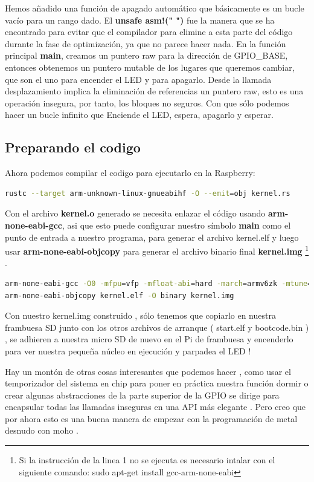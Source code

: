 \documentclass[12pt, twoside]{report}
\begin{document}
Hemos añadido una función de apagado automático que básicamente es un bucle vacío para un rango dado. El \textbf{unsafe { asm!(" ")}} fue la manera que se ha encontrado para evitar que el compilador para elimine a esta parte del código durante la fase de optimización, ya que no parece hacer nada. En la función principal \textbf{main}, creamos un puntero raw para la dirección de GPIO\_BASE, entonces obtenemos un puntero mutable de los lugares que queremos cambiar, que son el uno para encender el LED y para apagarlo. Desde la llamada desplazamiento implica la eliminación de referencias un puntero raw, esto es una operación insegura, por tanto, los bloques no seguros. Con que sólo podemos hacer un bucle infinito que Enciende el LED, espera, apagarlo y esperar.

\subsection{Preparando el codigo }

Ahora podemos compilar el codigo para ejecutarlo en la Raspberry:

\begin{lstlisting}[language=bash]
rustc --target arm-unknown-linux-gnueabihf -O --emit=obj kernel.rs
\end{lstlisting}

Con el archivo \textbf{kernel.o} generado se necesita enlazar el código usando \textbf{arm-none-eabi-gcc},  asi que esto puede configurar nuestro símbolo \textbf{main} como el punto de  entrada a nuestro programa, para generar el archivo kernel.elf y luego usar \textbf{arm-none-eabi-objcopy} para generar el archivo binario final \textbf{kernel.img} \footnote{Si la instrucción de la linea 1 no se ejecuta es necesario intalar con el siguiente comando: sudo apt-get install gcc-arm-none-eabi} .
\begin{lstlisting}[language=bash]
arm-none-eabi-gcc -O0 -mfpu=vfp -mfloat-abi=hard -march=armv6zk -mtune=arm1176jzf-s -nostartfiles kernel.o -o kernel.elf
arm-none-eabi-objcopy kernel.elf -O binary kernel.img
\end{lstlisting}
Con nuestro kernel.img construido , sólo tenemos que copiarlo en nuestra frambuesa SD junto con los otros archivos de arranque ( start.elf y bootcode.bin ) , se adhieren a nuestra micro SD de nuevo en el Pi de frambuesa y encenderlo para ver nuestra pequeña núcleo en ejecución y parpadea el LED !

Hay un montón de otras cosas interesantes que podemos hacer , como usar el temporizador del sistema en chip para poner en práctica nuestra función dormir o crear algunas abstracciones de la parte superior de la GPIO se dirige para encapsular todas las llamadas inseguras en una API más elegante . Pero creo que por ahora esto es una buena manera de empezar con la programación de metal desnudo con moho .
\end{document}
